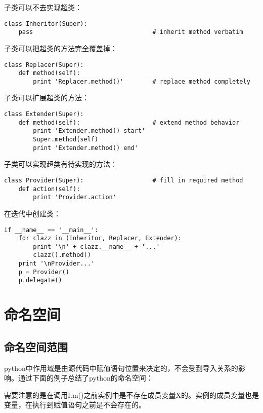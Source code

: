 子类可以不去实现超类：

\begin{lstlisting}
class Inheritor(Super):
	pass                                 # inherit method verbatim
\end{lstlisting}

子类可以把超类的方法完全覆盖掉：

\begin{lstlisting}
class Replacer(Super):
	def method(self):
		print 'Replacer.method()'        # replace method completely
\end{lstlisting}

子类可以扩展超类的方法：

\begin{lstlisting}
class Extender(Super):
	def method(self):                    # extend method behavior
		print 'Extender.method() start'
		Super.method(self)
		print 'Extender.method() end'
\end{lstlisting}

子类可以实现超类有待实现的方法：
		
\begin{lstlisting}
class Provider(Super):                   # fill in required method
	def action(self):
		print 'Provider.action'
\end{lstlisting}

在迭代中创建类：

\begin{lstlisting}
if __name__ == '__main__':
	for clazz in (Inheritor, Replacer, Extender):
		print '\n' + clazz.__name__ + '...'
		clazz().method()
	print '\nProvider...'
	p = Provider()
	p.delegate()
\end{lstlisting}

\section{命名空间}

\subsection{命名空间范围}

python中作用域是由源代码中赋值语句位置来决定的，不会受到导入关系的影响。通过下面的例子总结了python的命名空间：



需要注意的是在调用I.m()之前实例中是不存在成员变量X的。实例的成员变量也是变量，在执行到赋值语句之前是不会存在的。

